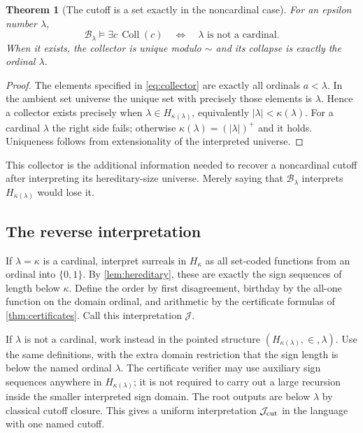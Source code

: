 \documentclass[11pt,letterpaper]{article}
\newtheorem{theorem}{Theorem}[section]
\theoremstyle{definition}
\theoremstyle{remark}
\newcommand{\B}{\mathcal B}
\newcommand{\J}{\mathcal J}
\newcommand{\Coll}{\operatorname{Coll}}
\newcommand{\card}[1]{\lvert#1\rvert}
\begin{document}
\begin{theorem}[The cutoff is a set exactly in the noncardinal case]
\label{thm:collector}
For an epsilon number $\lambda$,
\[
 \B_\lambda\models\exists c\,\Coll(c)
 \quad\Longleftrightarrow\quad
 \lambda\text{ is not a cardinal}.
\]
When it exists, the collector is unique modulo $\sim$ and its collapse is
exactly the ordinal $\lambda$.
\end{theorem}
\begin{proof}
The elements specified in \eqref{eq:collector} are exactly all ordinals
$a<\lambda$. In the ambient set universe the unique set with precisely
those elements is $\lambda$. Hence a collector exists precisely when
$\lambda\in H_{\kappa(\lambda)}$, equivalently
$\card\lambda<\kappa(\lambda)$. For a cardinal $\lambda$ the right side
fails; otherwise $\kappa(\lambda)=(\card\lambda)^+$ and it holds.
Uniqueness follows from extensionality of the interpreted universe.
\end{proof}

This collector is the additional information needed to recover a
noncardinal cutoff after interpreting its hereditary-size universe. Merely
saying that $\B_\lambda$ interprets $H_{\kappa(\lambda)}$ would lose it.

\subsection{The reverse interpretation}

If $\lambda=\kappa$ is a cardinal, interpret surreals in $H_\kappa$ as all
set-coded functions from an ordinal into $\{0,1\}$. By
\cref{lem:hereditary}, these are exactly the sign sequences of length below
$\kappa$. Define the order by first disagreement, birthday by the all-one
function on the domain ordinal, and arithmetic by the certificate formulas
of \cref{thm:certificates}. Call this interpretation $\J$.

If $\lambda$ is not a cardinal, work instead in the pointed structure
$(H_{\kappa(\lambda)},\in,\lambda)$. Use the same definitions, with the
extra domain restriction that the sign length is below the named ordinal
$\lambda$. The certificate verifier may use auxiliary sign sequences
anywhere in $H_{\kappa(\lambda)}$; it is not required to carry out a large
recursion inside the smaller interpreted sign domain. The root outputs are
below $\lambda$ by classical cutoff closure. This gives a uniform
interpretation $\J_{\rm cut}$ in the language with one named cutoff.
\end{document}

